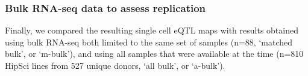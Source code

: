 \subsubsection{Bulk RNA-seq data to assess replication}

Finally, we compared the resulting single cell eQTL maps with results obtained using bulk RNA-seq both limited to the same set of samples (n=88, `matched bulk', or `m-bulk'), and using all samples that were available at the time (n=810 HipSci lines from 527 unique donors, `all bulk', or `a-bulk'). 







